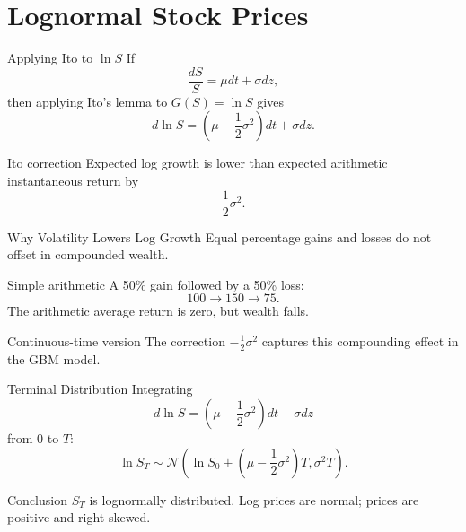 \documentclass[aspectratio=169,11pt]{beamer}
\newcommand{\Normal}{\mathcal{N}}
\newcommand{\Ito}{Ito}
\begin{document}
\section{Lognormal Stock Prices}

\begin{frame}[label=log_process_main]{Applying Ito to \(\ln S\)}
    If
    \[
        \frac{dS}{S}=\mu dt+\sigma dz,
    \]
    then applying \Ito's lemma to \(G(S)=\ln S\) gives
    \[
        d\ln S
        =
        \left(\mu-\frac{1}{2}\sigma^2\right)dt+\sigma dz.
    \]

    \begin{alertblock}{Ito correction}
        Expected log growth is lower than expected arithmetic instantaneous return by
        \[
            \frac{1}{2}\sigma^2.
        \]
    \end{alertblock}

    \hyperlink{deriv_log_process}{}
\end{frame}

\begin{frame}{Why Volatility Lowers Log Growth}
    Equal percentage gains and losses do not offset in compounded wealth.

    \begin{exampleblock}{Simple arithmetic}
        A 50\% gain followed by a 50\% loss:
        \[
            100 \rightarrow 150 \rightarrow 75.
        \]
        The arithmetic average return is zero, but wealth falls.
    \end{exampleblock}

    \begin{block}{Continuous-time version}
        The correction \(-\frac{1}{2}\sigma^2\) captures this compounding effect in the GBM model.
    \end{block}
\end{frame}

\begin{frame}[label=terminal_distribution_main]{Terminal Distribution}
    Integrating
    \[
        d\ln S
        =
        \left(\mu-\frac{1}{2}\sigma^2\right)dt+\sigma dz
    \]
    from 0 to \(T\):
    \[
        \ln S_T
        \sim
        \Normal\left(
            \ln S_0+\left(\mu-\frac{1}{2}\sigma^2\right)T,
            \sigma^2T
        \right).
    \]

    \begin{alertblock}{Conclusion}
        \(S_T\) is lognormally distributed.
        Log prices are normal; prices are positive and right-skewed.
    \end{alertblock}

    \hyperlink{deriv_lognormal}{}
\end{frame}
\end{document}
